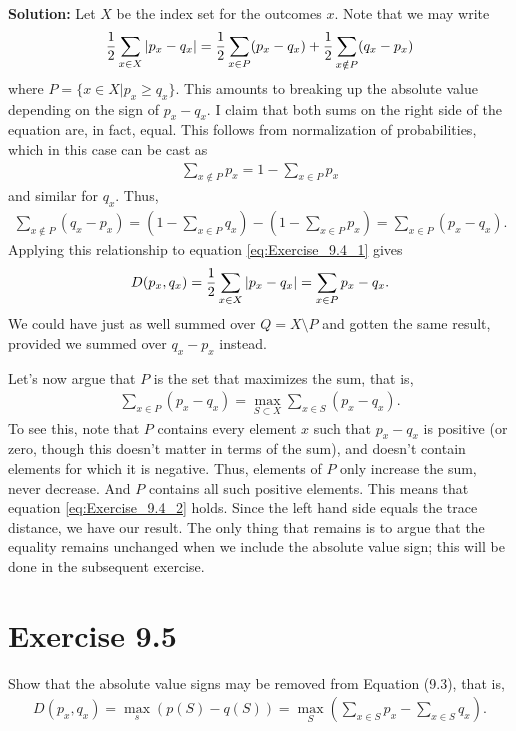 \documentclass{book}
\begin{document}
    \textbf{Solution:} Let $X$ be the index set for the outcomes $x$. Note that we may write
    \begin{align} \label{eq:Exercise_9.4_1}
        \frac{1}{2}\sum_{x\in X} \abs{p_x-q_x} = \frac{1}{2}\sum_{x\in P} (p_x-q_x) + \frac{1}{2} \sum_{x\notin P} (q_x-p_x)
    \end{align}
    where $P = \{x\in X| p_x \geq q_x\}$. This amounts to breaking up the absolute value depending on the sign of $p_x-q_x$. I claim that both sums on the right side of the equation are, in fact, equal. This follows from normalization of probabilities, which in this case can be cast as 
    \begin{align}
        \sum_{x\notin P} p_x = 1-\sum_{x\in P} p_x
    \end{align}
    and similar for $q_x$. Thus,
    \begin{align}
        \sum_{x\notin P} (q_x-p_x) = (1-\sum_{x\in P}q_x) - (1-\sum_{x\in P}p_x) = \sum_{x\in P }(p_x - q_x).
    \end{align}
    Applying this relationship to equation \eqref{eq:Exercise_9.4_1} gives
    \begin{align}
        D(p_x, q_x) = \frac{1}{2}\sum_{x\in X} \abs{p_x-q_x} = \sum_{x\in P} p_x - q_x.
    \end{align}
    We could have just as well summed over $Q = X\setminus P$ and gotten the same result, provided we summed over $q_x-p_x$ instead. 
    
    Let's now argue that $P$ is the set that maximizes the sum, that is,
    \begin{align} \label{eq:Exercise_9.4_2}
        \sum_{x\in P } (p_x-q_x) = \max_{S\subset X} \sum_{x\in S} (p_x -q_x).
    \end{align}
    To see this, note that $P$ contains every element $x$ such that $p_x-q_x$ is positive (or zero, though this doesn't matter in terms of the sum), and doesn't contain elements for which it is negative. Thus, elements of $P$ only increase the sum, never decrease. And $P$ contains all such positive elements. This means that equation \eqref{eq:Exercise_9.4_2} holds. Since the left hand side equals the trace distance, we have our result. The only thing that remains is to argue that the equality remains unchanged when we include the absolute value sign; this will be done in the subsequent exercise. 
    
\section*{Exercise 9.5}
    Show that the absolute value signs may be removed from Equation (9.3), that is,
    \begin{align}
        D(p_x, q_x) = \max_s (p(S)-q(S)) = \max_S \left(\sum_{x\in S} p_x -\sum_{x\in S} q_x\right).
    \end{align}
    
\end{document}
